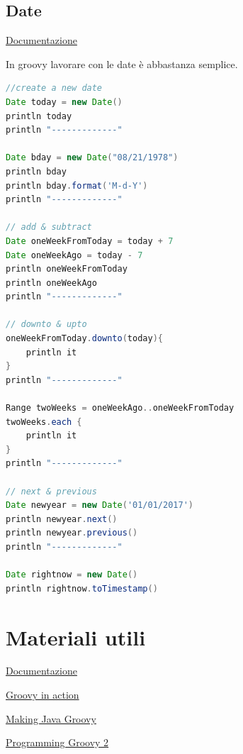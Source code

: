 \documentclass[11pt,a4paper]{book}
\begin{document}
\section{Date}
\href{https://docs.groovy-lang.org/latest/html/groovy-jdk/java/util/Date.html}{Documentazione}

In groovy lavorare con le date è abbastanza semplice.
\begin{lstlisting}[language = groovy]
//create a new date
Date today = new Date()
println today
println "-------------"

Date bday = new Date("08/21/1978")
println bday
println bday.format('M-d-Y')
println "-------------"

// add & subtract
Date oneWeekFromToday = today + 7
Date oneWeekAgo = today - 7
println oneWeekFromToday
println oneWeekAgo
println "-------------"

// downto & upto
oneWeekFromToday.downto(today){
    println it
}
println "-------------"

Range twoWeeks = oneWeekAgo..oneWeekFromToday
twoWeeks.each {
    println it
}
println "-------------"

// next & previous
Date newyear = new Date('01/01/2017')
println newyear.next()
println newyear.previous()
println "-------------"

Date rightnow = new Date()
println rightnow.toTimestamp()
\end{lstlisting}

\chapter{Materiali utili}
\href{https://groovy-lang.org/}{Documentazione}

\href{https://www.manning.com/books/groovy-in-action-second-edition}{Groovy in action}

\href{https://www.manning.com/books/making-java-groovy}{Making Java Groovy}

\href{https://pragprog.com/titles/vslg2/programming-groovy-2/}{Programming Groovy 2}
\end{document}
